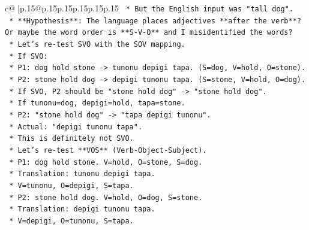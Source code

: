 \documentclass{article}
\begin{document}
{\begin{supertabular}{c@{$\;$}|p{.15\linewidth}@{}p{.15\linewidth}p{.15\linewidth}p{.15\linewidth}p{.15\linewidth}p{.15\linewidth}}
{{{\texttt{                                        *   But the English input was "tall dog".} \\
\texttt{                                        *   **Hypothesis**: The language places adjectives **after the verb**? Or maybe the word order is **S{-}V{-}O** and I misidentified the words?} \\
\texttt{                                        *   Let's re{-}test SVO with the SOV mapping.} \\
\texttt{                                        *   If SVO:} \\
\texttt{                                            *   P1: dog hold stone {-}> tunonu depigi tapa. (S=dog, V=hold, O=stone).} \\
\texttt{                                            *   P2: stone hold dog {-}> depigi tunonu tapa. (S=stone, V=hold, O=dog).} \\
\texttt{                                            *   If SVO, P2 should be "stone hold dog" {-}> "stone hold dog".} \\
\texttt{                                            *   If tunonu=dog, depigi=hold, tapa=stone.} \\
\texttt{                                            *   P2: "stone hold dog" {-}> "tapa depigi tunonu".} \\
\texttt{                                            *   Actual: "depigi tunonu tapa".} \\
\texttt{                                            *   This is definitely not SVO.} \\
\texttt{                                        *   Let's re{-}test **VOS** (Verb{-}Object{-}Subject).} \\
\texttt{                                            *   P1: dog hold stone. V=hold, O=stone, S=dog.} \\
\texttt{                                            *   Translation: tunonu depigi tapa.} \\
\texttt{                                            *   V=tunonu, O=depigi, S=tapa.} \\
\texttt{                                            *   P2: stone hold dog. V=hold, O=dog, S=stone.} \\
\texttt{                                            *   Translation: depigi tunonu tapa.} \\
\texttt{                                            *   V=depigi, O=tunonu, S=tapa.} \\
}}}
\end{supertabular}}
\end{document}
